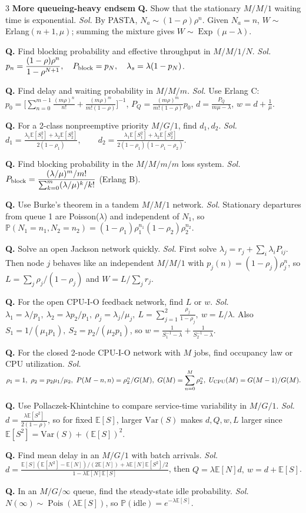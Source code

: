 \documentclass[a4paper,8pt,fleqn]{extarticle}
\newcommand{\E}{\mathbb{E}}
\newcommand{\PP}{\mathbb{P}}
\newcommand{\Var}{\mathrm{Var}}
\newcommand{\1}{\mathbf{1}}
\newcommand{\sub}[1]{\textbf{#1} }
\newcommand{\probq}[2]{\textbf{Q.} #1 \emph{Sol.} #2\par}
\DeclareMathOperator{\Pois}{Pois}
\DeclareMathOperator{\Exp}{Exp}
\begin{document}
\begin{multicols}{3}
\sub{More queueing-heavy endsem}
\probq{Show that the stationary \(M/M/1\) waiting time is exponential.}{By PASTA, \(N_a\sim(1-\rho)\rho^n\). Given \(N_a=n\), \(W\sim\) Erlang\((n+1,\mu)\); summing the mixture gives \(W\sim \Exp(\mu-\lambda)\).}
\probq{Find blocking probability and effective throughput in \(M/M/1/N\).}{\(\displaystyle p_n=\frac{(1-\rho)\rho^n}{1-\rho^{N+1}},\quad P_{\rm block}=p_N,\quad \lambda_s=\lambda(1-p_N)\).}
\probq{Find delay and waiting probability in \(M/M/m\).}{Use Erlang C: \(\displaystyle p_0=\Big[\sum_{n=0}^{m-1}\frac{(m\rho)^n}{n!}+\frac{(m\rho)^m}{m!(1-\rho)}\Big]^{-1}\), \(\displaystyle P_Q=\frac{(m\rho)^m}{m!(1-\rho)}p_0\), \(d=\frac{P_Q}{m\mu-\lambda}\), \(w=d+\frac1\mu\).}
\probq{For a 2-class nonpreemptive priority \(M/G/1\), find \(d_1,d_2\).}{\(\displaystyle d_1=\frac{\lambda_1\E[S_1^2]+\lambda_2\E[S_2^2]}{2(1-\rho_1)},\qquad d_2=\frac{\lambda_1\E[S_1^2]+\lambda_2\E[S_2^2]}{2(1-\rho_1)(1-\rho_1-\rho_2)}.\)}
\probq{Find blocking probability in the \(M/M/m/m\) loss system.}{\(\displaystyle P_{\rm block}=\frac{(\lambda/\mu)^m/m!}{\sum_{k=0}^m(\lambda/\mu)^k/k!}\) (Erlang B).}
\probq{Use Burke's theorem in a tandem \(M/M/1\) network.}{Stationary departures from queue 1 are Poisson(\(\lambda\)) and independent of \(N_1\), so \(\PP(N_1=n_1,N_2=n_2)=(1-\rho_1)\rho_1^{n_1}(1-\rho_2)\rho_2^{n_2}\).}
\probq{Solve an open Jackson network quickly.}{First solve \(\lambda_j=r_j+\sum_i \lambda_iP_{ij}\). Then node \(j\) behaves like an independent \(M/M/1\) with \(p_j(n)=(1-\rho_j)\rho_j^n\), so \(L=\sum_j \rho_j/(1-\rho_j)\) and \(W=L/\sum_j r_j\).}
\probq{For the open CPU-I-O feedback network, find \(L\) or \(w\).}{\(\displaystyle \lambda_1=\lambda/p_1,\ \lambda_2=\lambda p_2/p_1,\ \rho_j=\lambda_j/\mu_j,\ L=\sum_{j=1}^2\frac{\rho_j}{1-\rho_j},\ w=L/\lambda.\) Also \(S_1=1/(\mu_1p_1),\ S_2=p_2/(\mu_2p_1)\), so \(w=\frac{1}{S_1^{-1}-\lambda}+\frac{1}{S_2^{-1}-\lambda}\).}
\probq{For the closed 2-node CPU-I-O network with \(M\) jobs, find occupancy law or CPU utilization.}{\(\displaystyle \rho_1=1,\ \rho_2=p_2\mu_1/\mu_2,\ P(M-n,n)=\rho_2^n/G(M),\ G(M)=\sum_{n=0}^M\rho_2^n,\ U_{\rm CPU}(M)=G(M-1)/G(M).\)}
\probq{Use Pollaczek-Khintchine to compare service-time variability in \(M/G/1\).}{\(\displaystyle d=\frac{\lambda\E[S^2]}{2(1-\rho)}\), so for fixed \(\E[S]\), larger \(\Var(S)\) makes \(d,Q,w,L\) larger since \(\E[S^2]=\Var(S)+(\E[S])^2\).}
\probq{Find mean delay in an \(M/G/1\) with batch arrivals.}{\(\displaystyle d=\frac{\E[S](\E[N^2]-\E[N])/(2\E[N])+\lambda \E[N]\E[S^2]/2}{1-\lambda \E[N]\E[S]}\), then \(Q=\lambda\E[N]d,\ w=d+\E[S]\).}
\probq{In an \(M/G/\infty\) queue, find the steady-state idle probability.}{\(\displaystyle N(\infty)\sim\Pois(\lambda\E[S])\), so \(\PP(\text{idle})=e^{-\lambda\E[S]}\).}


\end{multicols}
\end{document}
